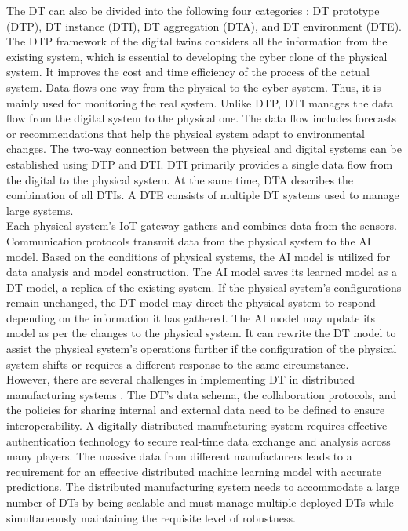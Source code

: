 \documentclass[paper=a4wide, fontsize=12pt]{scrartcl}
\begin{document}
The DT can also be divided into the following four categories \cite{fi14020064}: DT prototype (DTP), DT instance (DTI), DT aggregation (DTA), and DT environment (DTE). The DTP framework of the digital twins considers all the information from the existing system, which is essential to developing the cyber clone of the physical system. It improves the cost and time efficiency of the process of the actual system. Data flows one way from the physical to the cyber system. Thus, it is mainly used for monitoring the real system. Unlike DTP, DTI manages the data flow from the digital system to the physical one. The data flow includes forecasts or recommendations that help the physical system adapt to environmental changes. The two-way connection between the physical and digital systems can be established using DTP and DTI. DTI primarily provides a single data flow from the digital to the physical system. At the same time, DTA describes the combination of all DTIs. A DTE consists of multiple DT systems used to manage large systems. \\

Each physical system's IoT gateway gathers and combines data from the sensors. Communication protocols transmit data from the physical system to the AI model. Based on the conditions of physical systems, the AI model is utilized for data analysis and model construction. The AI model saves its learned model as a DT model, a replica of the existing system. If the physical system's configurations remain unchanged, the DT model may direct the physical system to respond depending on the information it has gathered. The AI model may update its model as per the changes to the physical system. It can rewrite the DT model to assist the physical system's operations further if the configuration of the physical system shifts or requires a different response to the same circumstance. \\

However, there are several challenges in implementing DT in distributed manufacturing systems \cite{machines9090193}. The DT's data schema, the collaboration protocols, and the policies for sharing internal and external data need to be defined to ensure interoperability. A digitally distributed manufacturing system requires effective authentication technology to secure real-time data exchange and analysis across many players. The massive data from different manufacturers leads to a requirement for an effective distributed machine learning model with accurate predictions. The distributed manufacturing system needs to accommodate a large number of DTs by being scalable and must manage multiple deployed DTs while simultaneously maintaining the requisite level of robustness. \\
\end{document}
